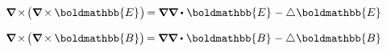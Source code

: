 ${
\boldnabla \hspace{-0.2ex} \times \hspace{-0.3ex} \bigl( \boldnabla \hspace{-0.15ex} \times \hspace{-0.1ex} \boldmathbb{E} \hspace{.1ex} \bigr) \hspace{-0.25ex}
= \hspace{-0.1ex} \boldnabla \boldnabla \dotp \hspace{.12ex} \boldmathbb{E} \hspace{.1ex} - \Laplacian \hspace{.05ex} \boldmathbb{E}
}$

${
\boldnabla \hspace{-0.2ex} \times \hspace{-0.3ex} \bigl( \boldnabla \hspace{-0.15ex} \times \hspace{-0.1ex} \boldmathbb{B} \bigr) \hspace{-0.25ex}
= \hspace{-0.1ex} \boldnabla \boldnabla \dotp \hspace{.12ex} \boldmathbb{B} \hspace{.1ex} - \Laplacian \hspace{.05ex} \boldmathbb{B}
}$

